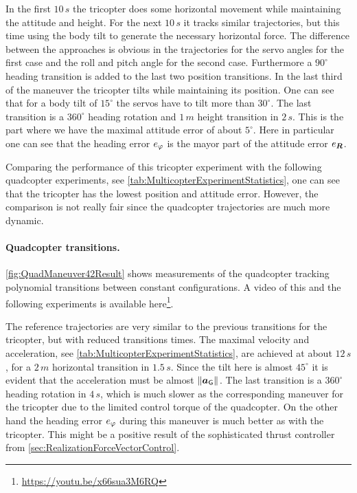 In the first $10\,\unit{s}$ the tricopter does some horizontal movement while maintaining the attitude and height.
For the next $10\,\unit{s}$ it tracks similar trajectories, but this time using the body tilt to generate the necessary horizontal force.
The difference between the approaches is obvious in the trajectories for the servo angles for the first case and the roll and pitch angle for the second case.
Furthermore a $90^\circ$ heading transition is added to the last two position transitions.
In the last third of the maneuver the tricopter tilts while maintaining its position.
One can see that for a body tilt of $15^\circ$ the servos have to tilt more than $30^\circ$.
The last transition is a $360^\circ$ heading rotation and $1\,\unit{m}$ height transition in $2\,\unit{s}$.
This is the part where we have the maximal attitude error of about $5^\circ$.
Here in particular one can see that the heading error $e_{\varphi}$ is the mayor part of the attitude error $e_{\boldsymbol{R}}$.

Comparing the performance of this tricopter experiment with the following quadcopter experiments, see \autoref{tab:MulticopterExperimentStatistics}, one can see that the tricopter has the lowest position and attitude error.
However, the comparison is not really fair since the quadcopter trajectories are much more dynamic.

\paragraph{Quadcopter transitions.}
\autoref{fig:QuadManeuver42Result} shows measurements of the quadcopter tracking polynomial transitions between constant configurations.
A video of this and the following experiments is available here\footnote{\url{https://youtu.be/x66sua3M6RQ}}.

The reference trajectories are very similar to the previous transitions for the tricopter, but with reduced transitions times.
The maximal velocity and acceleration, see \autoref{tab:MulticopterExperimentStatistics}, are achieved at about $12\,\unit{s}$, for a $2\,\unit{m}$ horizontal transition in $1.5\,\unit{s}$.
Since the tilt here is almost $45^\circ$ it is evident that the acceleration must be almost $\| \boldsymbol{a}_{\mathsf{G}} \|_{}$.
The last transition is a $360^\circ$ heading rotation in $4\,\unit{s}$, which is much slower as the corresponding maneuver for the tricopter due to the limited control torque of the quadcopter.
On the other hand the heading error $e_{\varphi}$ during this maneuver is much better as with the tricopter.
This might be a positive result of the sophisticated thrust controller from \autoref{sec:RealizationForceVectorControl}.

